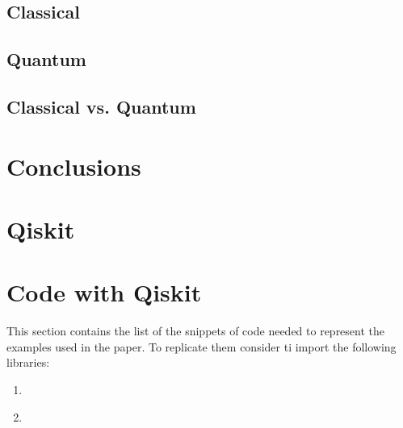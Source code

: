 \documentclass[english]{article}
\begin{document}
		\subsection{Classical}
		\label{sec:satClassical}
		
		\subsection{Quantum}
		\label{sec:satQuantum}
		
		\subsection{Classical vs. Quantum}
		\label{sec:satCsatQ}
		
	\section{Conclusions}
	\label{sec:conclusions}
	
	\clearpage
	\begin{appendices}
		\section{Qiskit}
		\label{sec:qiskit}
		
		\section{Code with Qiskit}
		This section contains the list of the snippets of code needed to represent the examples used in the paper. To replicate them consider ti import the following libraries:
		
		
		\label{sec:codeWithQiskit}
			\begin{enumerate}
				\item \label{c:example3} 
				
				\item \label{c:example6} 
			\end{enumerate}
	\end{appendices}
	
	\clearpage
	
	\nocite{*}
	
\end{document}
